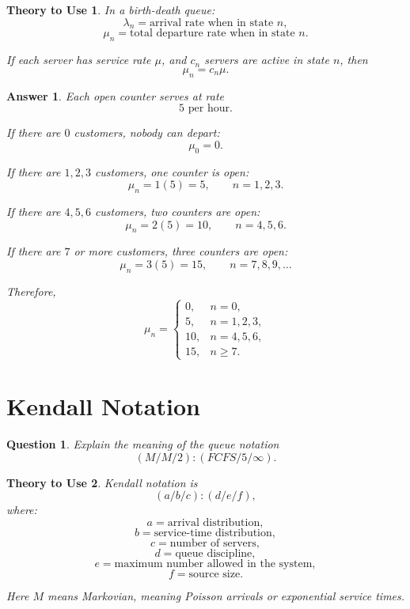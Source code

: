 \documentclass[12pt]{article}
\newtheorem{question}{Question}
\newtheorem*{theory}{Theory to Use}
\newtheorem*{answer}{Answer}
\begin{document}
\begin{theory}
In a birth-death queue:
\[
\lambda_n=\text{arrival rate when in state }n,
\]
\[
\mu_n=\text{total departure rate when in state }n.
\]

If each server has service rate \(\mu\), and \(c_n\) servers are active in state \(n\), then
\[
\mu_n=c_n\mu.
\]
\end{theory}

\begin{answer}
Each open counter serves at rate
\[
5\text{ per hour}.
\]

If there are \(0\) customers, nobody can depart:
\[
\mu_0=0.
\]

If there are \(1,2,3\) customers, one counter is open:
\[
\mu_n=1(5)=5,\qquad n=1,2,3.
\]

If there are \(4,5,6\) customers, two counters are open:
\[
\mu_n=2(5)=10,\qquad n=4,5,6.
\]

If there are \(7\) or more customers, three counters are open:
\[
\mu_n=3(5)=15,\qquad n=7,8,9,\ldots
\]

Therefore,
\[
\boxed{
\mu_n=
\begin{cases}
0, & n=0,\\
5, & n=1,2,3,\\
10, & n=4,5,6,\\
15, & n\ge 7.
\end{cases}
}
\]
\end{answer}

\section{Kendall Notation}

\begin{question}
Explain the meaning of the queue notation
\[
(M/M/2):(FCFS/5/\infty).
\]
\end{question}

\begin{theory}
Kendall notation is
\[
(a/b/c):(d/e/f),
\]
where:
\[
a=\text{arrival distribution},
\]
\[
b=\text{service-time distribution},
\]
\[
c=\text{number of servers},
\]
\[
d=\text{queue discipline},
\]
\[
e=\text{maximum number allowed in the system},
\]
\[
f=\text{source size}.
\]

Here \(M\) means Markovian, meaning Poisson arrivals or exponential service times.
\end{theory}
\end{document}
